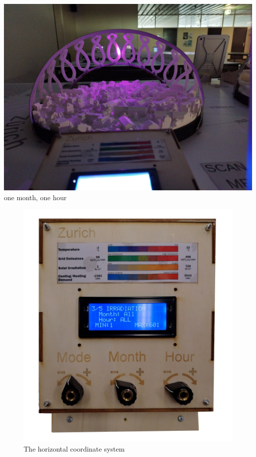 \documentclass[a4paper,9pt]{article}
\begin{document}
\begin{minipage}{0.31\linewidth}
    \centering
    \includegraphics[width=.95\linewidth]{Images/d.jpg}
    \\{one month, one hour}
\end{minipage}
\label{controoool}
\begin{center}
\begin{minipage}{0.48\linewidth}
         \begin{figure}[H]
        \centering
        \includegraphics[width=.85\linewidth]{Images/box.jpg}
        \caption{The horizontal coordinate system}
        \label{boxxx}
    \end{figure}
\end{minipage}
\end{center}
\end{document}
